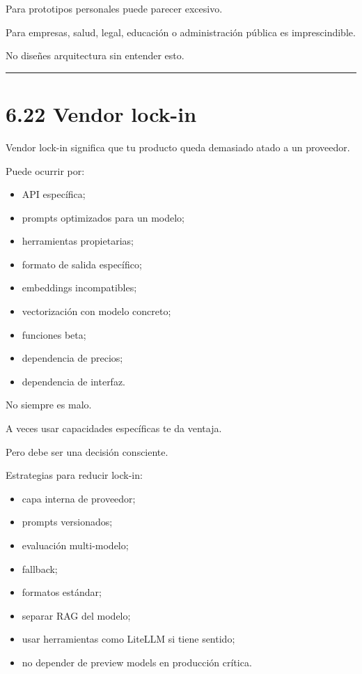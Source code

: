 Para prototipos personales puede parecer excesivo.

Para empresas, salud, legal, educación o administración pública es
imprescindible.

No diseñes arquitectura sin entender esto.

\begin{center}\rule{0.5\linewidth}{0.5pt}\end{center}

\section{6.22 Vendor lock-in}\label{vendor-lock-in}

Vendor lock-in significa que tu producto queda demasiado atado a un
proveedor.

Puede ocurrir por:

\begin{itemize}
\tightlist
\item
  API específica;
\item
  prompts optimizados para un modelo;
\item
  herramientas propietarias;
\item
  formato de salida específico;
\item
  embeddings incompatibles;
\item
  vectorización con modelo concreto;
\item
  funciones beta;
\item
  dependencia de precios;
\item
  dependencia de interfaz.
\end{itemize}

No siempre es malo.

A veces usar capacidades específicas te da ventaja.

Pero debe ser una decisión consciente.

Estrategias para reducir lock-in:

\begin{itemize}
\tightlist
\item
  capa interna de proveedor;
\item
  prompts versionados;
\item
  evaluación multi-modelo;
\item
  fallback;
\item
  formatos estándar;
\item
  separar RAG del modelo;
\item
  usar herramientas como LiteLLM si tiene sentido;
\item
  no depender de preview models en producción crítica.
\end{itemize}

